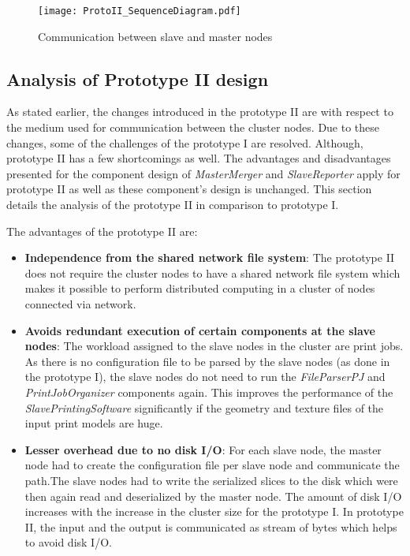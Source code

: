 \begin{figure}[!t]
\centering
\texttt{[image: ProtoII\_SequenceDiagram.pdf]}
\caption{Communication between slave and master nodes}
\label{fig:ProtoII}
\end{figure}

\subsection{Analysis of Prototype II design}

As stated earlier, the changes introduced in the prototype II are with respect to the medium used for communication between the cluster nodes. Due to these changes, some of the challenges of the prototype I are resolved. Although, prototype II has a few shortcomings as well. The advantages and disadvantages presented for the component design of \textit{MasterMerger} and \textit{SlaveReporter} apply for prototype II as well as these component's design is unchanged. This section details the analysis of the  prototype II in comparison to prototype I. 

The advantages of the prototype II are:
\begin{itemize}
\item \textbf{Independence from the shared network file system}: The prototype II does not require the cluster nodes to have a shared network file system which makes it possible to perform distributed computing in a cluster of nodes connected via network. 
\item \textbf{Avoids redundant execution of certain components at the slave nodes}: The workload assigned to the slave nodes in the cluster are print jobs. As there is no configuration file to be parsed by the slave nodes (as done in the prototype I), the slave nodes do not need to run the \textit{FileParserPJ} and \textit{PrintJobOrganizer} components again. This improves the performance of the \textit{SlavePrintingSoftware} significantly if the geometry and texture files of the input print models are huge.   
\item \textbf{Lesser overhead due to no disk I/O}: For each slave node, the master node had to create the configuration file per slave node and communicate the path.The slave nodes had to write the serialized slices to the disk which were then again read and deserialized by the master node. The amount of disk I/O increases with the increase in the cluster size for the prototype I. In prototype II, the input and the output is communicated as stream of bytes which helps to avoid disk I/O.
\end{itemize}

